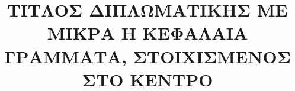 \documentclass{uthece-thesis}
\title{ΤΙΤΛΟΣ ΔΙΠΛΩΜΑΤΙΚΗΣ ΜΕ ΜΙΚΡΑ H ΚΕΦΑΛΑΙΑ ΓΡΑΜΜΑΤΑ, ΣΤΟΙΧΙΣΜΕΝΟΣ ΣΤΟ ΚΕΝΤΡΟ}
\begin{document}
\frontmatter
\maketitle


	\listoffigures %
	\listoftables %
%


\mainmatter
    
    
    
%


    
	
    \nocite{*}




\ifgrthesisoption
    \renewcommand{\chaptername}{Παράρτημα}
\else
    \renewcommand{\chaptername}{Appendix}
\fi

%   		
%     

%
%    

%
\end{document}
